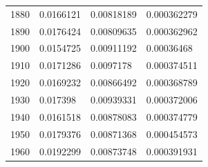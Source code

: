 \begin{center}
\begin{longtable}{l|l|l|l}
1880                                                   & 0.0166121                                                         & 0.00818189                                               & 0.000362279                                                        \\
1890                                                   & 0.0176424                                                         & 0.00809635                                               & 0.000362962                                                        \\
1900                                                   & 0.0154725                                                         & 0.00911192                                               & 0.00036468                                                         \\
1910                                                   & 0.0171286                                                         & 0.0097178                                                & 0.000374511                                                        \\
1920                                                   & 0.0169232                                                         & 0.00866492                                               & 0.000368789                                                        \\
1930                                                   & 0.017398                                                          & 0.00939331                                               & 0.000372006                                                        \\
1940                                                   & 0.0161518                                                         & 0.00878083                                               & 0.000374779                                                        \\
1950                                                   & 0.0179376                                                         & 0.00871368                                               & 0.000454573                                                        \\
1960                                                   & 0.0192299                                                         & 0.00873748                                               & 0.000391931                                                        \\

\end{longtable}
\end{center}
